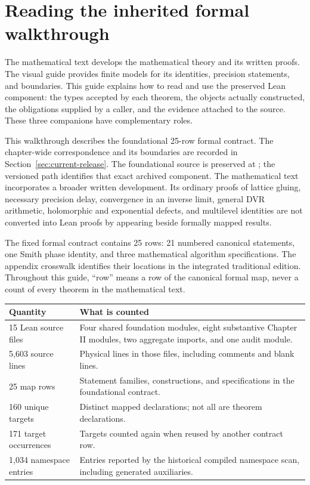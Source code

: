 \section{Reading the inherited formal walkthrough}\label{sec:orientation}

The mathematical text develops the mathematical theory and its written proofs. The visual guide provides finite models for its identities, precision statements, and boundaries. This guide explains how to read and use the preserved Lean component: the types accepted by each theorem, the objects actually constructed, the obligations supplied by a caller, and the evidence attached to the source. These three companions have complementary roles.

This walkthrough describes the foundational 25-row formal contract. The chapter-wide correspondence and its boundaries are recorded in Section~\ref{sec:current-release}. The foundational source is preserved at ; the versioned path identifies that exact archived component. The mathematical text incorporates a broader written development. Its ordinary proofs of lattice gluing, necessary precision delay, convergence in an inverse limit, general DVR arithmetic, holomorphic and exponential defects, and multilevel identities are not converted into Lean proofs by appearing beside formally mapped results.

The fixed formal contract contains 25 rows: 21 numbered canonical statements, one Smith phase identity, and three mathematical algorithm specifications. The appendix crosswalk identifies their locations in the integrated traditional edition. Throughout this guide, ``row'' means a row of the canonical formal map, never a count of every theorem in the mathematical text.

\begin{tabular}{p{}p{}}
\toprule Quantity & What is counted \\\midrule
15 Lean source files & Four shared foundation modules, eight substantive Chapter II modules, two aggregate imports, and one audit module. \\
5,603 source lines & Physical lines in those files, including comments and blank lines. \\
25 map rows & Statement families, constructions, and specifications in the foundational contract. \\
160 unique targets & Distinct mapped declarations; not all are theorem declarations. \\
171 target occurrences & Targets counted again when reused by another contract row. \\
1,034 namespace entries & Entries reported by the historical compiled namespace scan, including generated auxiliaries. \\
\bottomrule
\end{tabular}

